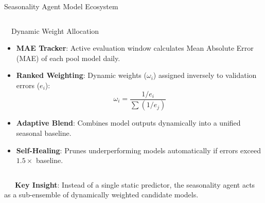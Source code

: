 \documentclass{beamer}
\begin{document}
\begin{frame}{Seasonality Agent Model Ecosystem}
\begin{columns}[T]
    \begin{column}{0.48\textwidth}
        \begin{successcard}[height=4.6cm]{~~Dynamic Weight Allocation}
            \fontsize{6.8pt}{8.2pt}\selectfont
            \begin{itemize}\setlength\itemsep{3pt}\setlength\parskip{0pt}
                \item \textbf{MAE Tracker}: Active evaluation window calculates Mean Absolute Error (MAE) of each pool model daily.
                \item \textbf{Ranked Weighting}: Dynamic weights ($\omega_i$) assigned inversely to validation errors ($e_i$):
                \[ \omega_i = \frac{1/e_i}{\sum (1/e_j)} \]
                \item \textbf{Adaptive Blend}: Combines model outputs dynamically into a unified seasonal baseline.
                \item \textbf{Self-Healing}: Prunes underperforming models automatically if errors exceed $1.5\times$ baseline.
            \end{itemize}
        \end{successcard}
    \end{column}
\end{columns}

\vspace{0.08cm}
\begin{tcolorbox}[enhanced, colback=primaryblue!4, colframe=primaryblue!30, boxrule=0.35pt,
  arc=3.5pt, width=0.98\textwidth, left=4pt, right=4pt, top=2.5pt, bottom=2.5pt, boxsep=0pt,
  halign=center, shadow={0.5pt}{-0.5pt}{0pt}{black!8}]
    \fontsize{5.5pt}{6.5pt}\selectfont
    \textcolor{primaryDark}{~~~\textbf{Key Insight}: Instead of a single static predictor, the seasonality agent acts as a sub-ensemble of dynamically weighted candidate models.}
\end{tcolorbox}
\end{frame}
\end{document}
